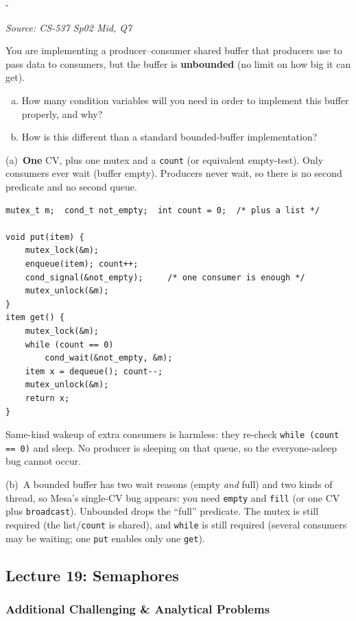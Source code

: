 \documentclass[11pt,a4paper]{article}
\makeatletter
\newcommand{\keepspace}[1]{\par\penalty-100\begingroup
  \setlength{\dimen@}{#1}\dimen@ii\pagegoal\advance\dimen@ii-\pagetotal
  \ifdim\dimen@>\dimen@ii\ifdim\dimen@ii>\z@\vfil\fi\break\fi\endgroup}
\newcounter{qn}[section]
\newenvironment{Qn}[4]{%
  \refstepcounter{qn}\keepspace{7\baselineskip}%
  \begin{tcolorbox}[qboxstyle, title={Q\thesection.\theqn\ \ [#1 \textbar\ #2]\ \ #4}]%
  {\footnotesize\color{g3}\textit{Source: #3}}\par\smallskip%
}{%
  \end{tcolorbox}%
}
\newenvironment{Sol}{%
  \begin{tcolorbox}[sboxstyle, title={Solution}]%
}{%
  \end{tcolorbox}\vspace{0.35em}%
}
\makeatother
\begin{document}
\begin{Qn}{Easy-Medium}{Lect 18}{CS-537 Sp02 Mid, Q7}{How many CVs for an unbounded buffer?}
You are implementing a producer--consumer shared buffer that producers
use to pass data to consumers, but the buffer is \textbf{unbounded}
(no limit on how big it can get).
\begin{enumerate}[(a)]
\item How many condition variables will you need in order to implement
      this buffer properly, and why?
\item How is this different than a standard bounded-buffer
      implementation?
\end{enumerate}
\end{Qn}
\begin{Sol}
(a)~\textbf{One} CV, plus one mutex and a \texttt{count} (or equivalent
empty-test). Only consumers ever wait (buffer empty). Producers never
wait, so there is no second predicate and no second queue.
\begin{lstlisting}[numbers=none]
mutex_t m;  cond_t not_empty;  int count = 0;  /* plus a list */

void put(item) {
    mutex_lock(&m);
    enqueue(item); count++;
    cond_signal(&not_empty);     /* one consumer is enough */
    mutex_unlock(&m);
}
item get() {
    mutex_lock(&m);
    while (count == 0)
        cond_wait(&not_empty, &m);
    item x = dequeue(); count--;
    mutex_unlock(&m);
    return x;
}
\end{lstlisting}
Same-kind wakeup of extra consumers is harmless: they re-check
\texttt{while (count == 0)} and sleep. No producer is sleeping on
that queue, so the everyone-asleep bug cannot occur.

(b)~A bounded buffer has two wait reasons (empty \emph{and} full) and
two kinds of thread, so Mesa's single-CV bug appears: you need
\texttt{empty} and \texttt{fill} (or one CV plus \texttt{broadcast}).
Unbounded drops the ``full'' predicate. The mutex is still required
(the list/\texttt{count} is shared), and \texttt{while} is still
required (several consumers may be waiting; one \texttt{put} enables
only one \texttt{get}).
\end{Sol}

\subsection{Lecture 19: Semaphores}

\subsubsection*{Additional Challenging \& Analytical Problems}
\end{document}
